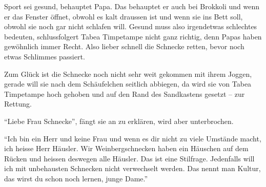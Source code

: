 Sport sei gesund, behauptet Papa. Das behauptet er auch bei Brokkoli und wenn er das Fenster öffnet, obwohl es kalt draussen ist und wenn sie ins Bett soll, obwohl sie noch gar nicht schlafen will. Gesund muss also irgendetwas schlechtes bedeuten, schlussfolgert Tabea Timpetampe nicht ganz richtig, denn Papas haben gewöhnlich immer Recht. Also lieber schnell die Schnecke retten, bevor noch etwas Schlimmes passiert.

Zum Glück ist die Schnecke noch nicht sehr weit gekommen mit ihrem Joggen, gerade will sie nach dem Schäufelchen seitlich abbiegen, da wird sie von Tabea Timpetampe hoch gehoben und auf den Rand des Sandkastens gesetzt -- zur Rettung. 

\enquote{Liebe Frau Schnecke}, fängt sie an zu erklären, wird aber unterbrochen.

\enquote{Ich bin ein Herr und keine Frau und wenn es dir nicht zu viele Umstände macht, ich heisse Herr Häusler. Wir Weinbergschnecken haben ein Häuschen auf dem Rücken und heissen deswegen alle Häusler. Das ist eine Stilfrage. Jedenfalls will ich mit unbehausten Schnecken nicht verwechselt werden. Das nennt man Kultur, das wirst du schon noch lernen, junge Dame.}


